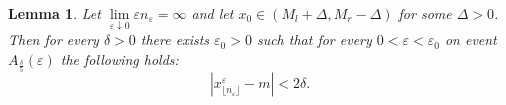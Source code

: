 \documentclass{article}
\theoremstyle{plain}
\newtheorem{lemma}[theorem]{Lemma}
\theoremstyle{definition}
\theoremstyle{remark}
\newcommand{\beq}{\begin{equation}}
\newcommand{\eeq}{\end{equation}}
\begin{document}
\begin{lemma} \label{l.3}
Let $\lim\limits_{\varepsilon\downarrow 0}\varepsilon n_\varepsilon=\infty$ and let $x_0 \in (M_{l}+\Delta, M_{r}-\Delta)$ for some $\Delta >0$.
Then for every $\delta>0$ there exists $\varepsilon_0 > 0$ such that for every $0<\varepsilon<\varepsilon_0$ on event $A_{\frac{\delta}{5}}\left(\varepsilon\right)$ the following holds:
\beq\label{20.11.1}
|x_{\lfloor n_\varepsilon \rfloor}^{\varepsilon} - m| < 2\delta.
\eeq
\end{lemma}
\end{document}
